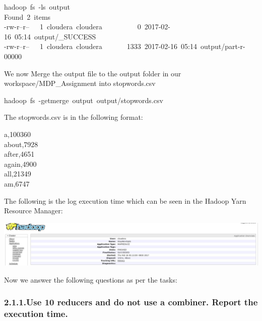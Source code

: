 \documentclass{article}
\begin{document}
\begin{mdpre}%
\noindent hadoop~fs~-ls~output\\
Found~{2}~items\\
-rw-r--r--~~~{1}~cloudera~cloudera~~~~~~~~~~{0}~{2017}-{02}-{16}~{05}:{14}~output/\_SUCCESS\\
-rw-r--r--~~~{1}~cloudera~cloudera~~~~~~~{1333}~{2017}-{02}-{16}~{05}:{14}~output/part-r-{00000}\\
\end{mdpre}\noindent We now Merge the output file to the output folder in our workspace/MDP\_Assignment into stopwords.csv
\begin{mdpre}%
\noindent hadoop~fs~-getmerge~output~output/stopwords.csv\\
\end{mdpre}\noindent The stopwords.csv is in the following format:
\begin{mdpre}%
\noindent a,{100360}\\
about,{7928}\\
after,{4651}\\
again,{4900}\\
all,{21349}\\
am,{6747}%
\end{mdpre}\noindent The following is the log execution time which can be seen in the Hadoop Yarn Resource Manager: 

\includegraphics[keepaspectratio=true,width=\dimmin{}{\dimwidth{1.30}}]{images/16763454_10208853135827919_2062444645_o}{}%

\noindent Now we answer the following questions as per the tasks:%

\subsubsection{2.1.1.\hspace*{0.5em}Use  10 reducers and do not use a combiner. Report the execution time.}\label{heading}%
\end{document}
